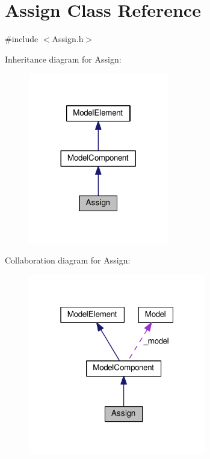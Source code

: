 \hypertarget{class_assign}{}\section{Assign Class Reference}
\label{class_assign}


{\ttfamily \#include $<$Assign.\+h$>$}



Inheritance diagram for Assign\+:\nopagebreak
\begin{figure}[H]
\begin{center}
\leavevmode
\includegraphics[width=173pt]{class_assign__inherit__graph}
\end{center}
\end{figure}


Collaboration diagram for Assign\+:\nopagebreak
\begin{figure}[H]
\begin{center}
\leavevmode
\includegraphics[width=220pt]{class_assign__coll__graph}
\end{center}
\end{figure}
